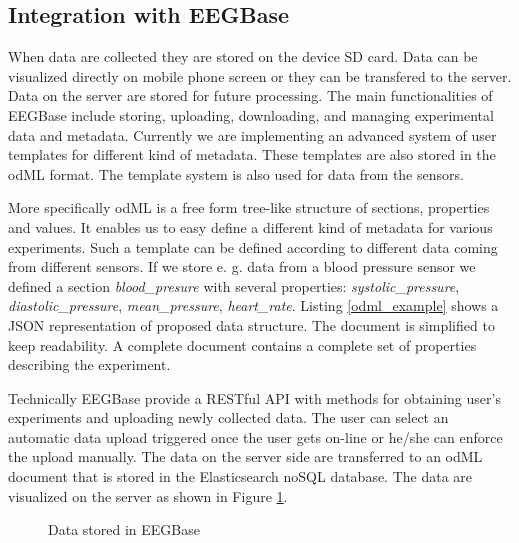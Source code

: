 \documentclass[a4paper,twoside]{article}
\begin{document}
\subsection{Integration with EEGBase}

When data are collected they are stored on the device SD card. Data can be visualized directly on mobile phone screen or they can be transfered to the server. Data on the server are stored for future processing. The main functionalities of EEGBase include storing, uploading, downloading, and managing experimental data and metadata. Currently we are implementing an advanced system of user templates for different kind of metadata. These templates are also stored in the odML format. The template system is also used for data from the sensors.

More specifically odML is  a free form tree-like structure of sections, properties and values. It enables us to easy define a different kind of metadata for various experiments. Such a template can be defined according to different data coming from different sensors. If we store e. g. data from a blood pressure sensor we  defined a section \emph{blood\_presure} with several properties: \textit{systolic\_pressure}, \textit{diastolic\_pressure}, \textit{mean\_pressure}, \textit{heart\_rate}. Listing \ref{odml_example} shows a JSON representation of proposed data structure. The document is simplified to keep readability. A complete document contains a complete set of properties describing the experiment.

Technically EEGBase provide a RESTful API with methods for obtaining user's experiments and uploading newly collected data. The user can select an automatic data upload triggered once the user gets on-line or he/she can enforce the upload manually. The data on the server side are transferred to an odML document that is stored in the Elasticsearch noSQL database. The data are visualized on the server as shown in Figure \ref{fig:EEGBase}.


\begin{figure}

  \centering
   {}
  \caption{Data stored in EEGBase}
  \label{fig:EEGBase}
 \end{figure}
\end{document}
